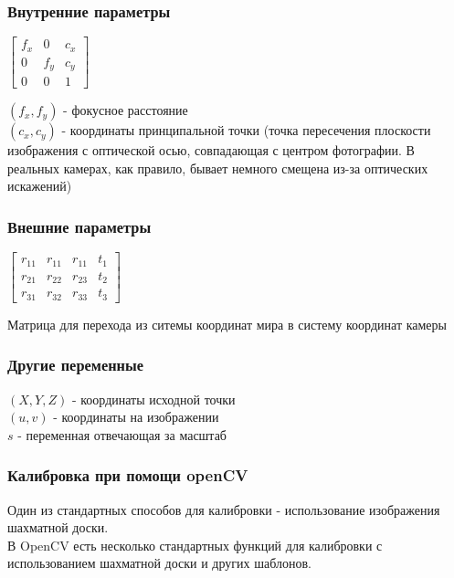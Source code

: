 \documentclass{beamer}
\begin{document}
		\begin{frame}
			\frametitle{Внутренние параметры}
			
			\begin{center}
			$
			\begin{bmatrix}
			f_{x}&0&c_{x}\\
			0&f_{y}&c_{y}\\
			0&0&1
			\end{bmatrix}
			$
			\end{center}
			$(f_{x},f_{y})$ - фокусное расстояние\\
			$(c_{x},c_{y})$ - координаты принципальной точки 
			(точка пересечения плоскости изображения с оптической осью, совпадающая с
			центром фотографии. В реальных камерах, как правило, бывает немного смещена
			из-за оптических искажений)
		\end{frame}
				
		\begin{frame}
			\frametitle{Внешние параметры}
			
			\begin{center}
			$
			\begin{bmatrix}
			r_{11}&r_{11}&r_{11}&t_{1}\\
			r_{21}&r_{22}&r_{23}&t_{2}\\
			r_{31}&r_{32}&r_{33}&t_{3}
			\end{bmatrix}
			$
			\end{center}
			Матрица для перехода из ситемы координат мира в систему координат камеры
		\end{frame}
					
		\begin{frame}
			\frametitle{Другие переменные}
			
			$(X,Y,Z)$ - координаты исходной точки\\
			$(u,v)$ - координаты на изображении\\
			$s$ - переменная отвечающая за масштаб
		\end{frame}
		
		\begin{frame}
			\frametitle{Калибровка при помощи openCV}
			
			Один из стандартных способов для калибровки - использование изображения 
			шахматной доски.\\
			В OpenCV есть несколько стандартных функций для калибровки с использованием 
			шахматной доски и других шаблонов.
		\end{frame}
		
\end{document}
